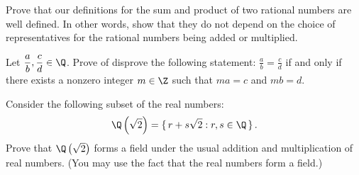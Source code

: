 \documentclass[12pt,letterpaper,boxed,cm]{hmcpset}
\newcommand{\pn}[1]{\left( #1 \right)}
\begin{document}

\begin{problem}[(1)]
    Prove that our definitions for the sum and product of two rational numbers are well defined. In other words, show that they do not depend on the choice of representatives for the rational numbers being added or multiplied.
\end{problem}

\begin{solution}
    \vfill
\end{solution}
\newpage

\begin{problem}[(2)]
    Let $\displaystyle \frac{a}{b},\frac{c}{d}\in \Q$. Prove of disprove the following statement: $\displaystyle \frac{a}{b}=\frac{c}{d}$ if and only if there exists a nonzero integer $m\in\Z$ such that $ma=c$ and $mb=d$.
\end{problem}

\begin{solution}
    \vfill
\end{solution}
\newpage

\begin{problem}[(3)]
    Consider the following subset of the real numbers:
    \[
        \Q\pn{\sqrt{2}}=\set{r+s \sqrt{2}: r,s\in\Q}.
    \]
    Prove that $\Q\pn{\sqrt{2}}$ forms a field under the usual addition and multiplication of real numbers. (You may use the fact that the real numbers form a field.)
\end{problem}

\begin{solution}
    \vfill
\end{solution}
\end{document}
